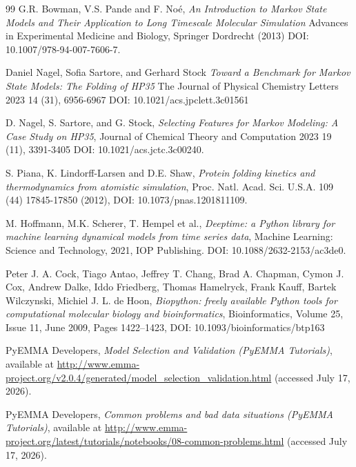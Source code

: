 \documentclass[prl,twocolumn]{revtex4-1}
\begin{document}
\begin{thebibliography}{99}
    G.R. Bowman, V.S. Pande and F. Noé,
    \textit{An Introduction to Markov State Models and Their Application to Long Timescale Molecular Simulation}
    Advances in Experimental Medicine and Biology, Springer Dordrecht (2013)
    DOI:  10.1007/978-94-007-7606-7.

Daniel Nagel, Sofia Sartore, and Gerhard Stock
\textit{Toward a Benchmark for Markov State Models: The Folding of HP35}
The Journal of Physical Chemistry Letters 2023 14 (31), 6956-6967
DOI: 10.1021/acs.jpclett.3c01561

    D. Nagel, S. Sartore, and G. Stock,
    \textit{Selecting Features for Markov Modeling: A Case Study on HP35},
    Journal of Chemical Theory and Computation 2023 19 (11), 3391-3405
    DOI:  10.1021/acs.jctc.3c00240.

    S. Piana, K. Lindorff-Larsen and D.E. Shaw,  
    \textit{Protein folding kinetics and thermodynamics from atomistic simulation}, 
    Proc. Natl. Acad. Sci. U.S.A. 109 (44) 17845-17850 (2012), 
    DOI: 10.1073/pnas.1201811109.

   M. Hoffmann, M.K. Scherer, T. Hempel et al.,
  \textit{Deeptime: a Python library for machine learning dynamical models from time series data},
  Machine Learning: Science and Technology, 2021, IOP Publishing.
DOI: 10.1088/2632-2153/ac3de0.

    Peter J. A. Cock, Tiago Antao, Jeffrey T. Chang, Brad A. Chapman, Cymon J. Cox, Andrew Dalke, Iddo Friedberg, Thomas Hamelryck, Frank Kauff, Bartek Wilczynski, Michiel J. L. de Hoon, \textit{Biopython: freely available Python tools for computational molecular biology and bioinformatics}, Bioinformatics, Volume 25, Issue 11, June 2009, Pages 1422–1423, DOI: 10.1093/bioinformatics/btp163


PyEMMA Developers,
\textit{Model Selection and Validation (PyEMMA Tutorials)},
available at \url{http://www.emma-project.org/v2.0.4/generated/model_selection_validation.html}
(accessed July 17, 2026).

PyEMMA Developers,
\textit{Common problems and bad data situations (PyEMMA Tutorials)},
available at \url{http://www.emma-project.org/latest/tutorials/notebooks/08-common-problems.html}
(accessed July 17, 2026).


\end{thebibliography}
\end{document}

